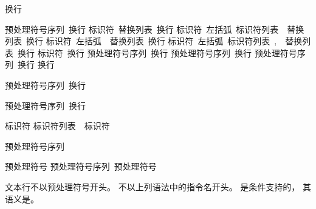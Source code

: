 \begin{bnftab}
\br
\>\>\>换行
\end{bnftab}

\begin{bnftab}
\br
\>\>\>预处理符号序列~换行\br
\>\>\>标识符~替换列表~换行\br
\>\>\>标识符~左括弧~标识符列表\opt{}~\terminal{)}~替换列表~换行\br
\>\>\>标识符~左括弧~~替换列表~换行\br
\>\>\>标识符~左括弧~标识符列表~,~~替换列表~换行\br
\>\>\>标识符~换行\br
\>\>\>预处理符号序列~换行\br
\>\>\>预处理符号序列\opt~换行\br
\>\>\>预处理符号序列\opt~换行\br
\>\terminal{\# }换行
\end{bnftab}

\begin{bnf}
\br
    预处理符号序列\opt~换行
\end{bnf}

\begin{bnf}
\br
    预处理符号序列~换行
\end{bnf}

\begin{bnf}
\br
\end{bnf}

\begin{bnf}
\br
    标识符\br
    标识符列表~\terminal{,}~标识符
\end{bnf}

\begin{bnf}
\br
    预处理符号序列\opt
\end{bnf}

\begin{bnf}
\br
    预处理符号\br
    预处理符号序列~预处理符号
\end{bnf}

\begin{bnf}
\br
\end{bnf}

\pnum
文本行不以预处理符号\tcode{\#}开头。
不以上列语法中的指令名开头。
是条件支持的，
其语义是。

